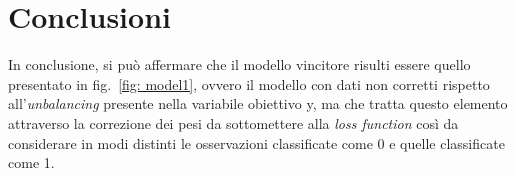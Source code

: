 \documentclass{article}
\begin{document}
\section{Conclusioni}
In conclusione, si può affermare che il modello vincitore risulti essere quello presentato in fig.~\ref{fig: model1}, ovvero il modello con dati non corretti rispetto all'\textit{unbalancing} presente nella variabile obiettivo y, ma che tratta questo elemento attraverso la correzione dei pesi da sottomettere alla \textit{loss function} così da considerare in modi distinti le osservazioni classificate come 0 e quelle classificate come 1.
\end{document}
